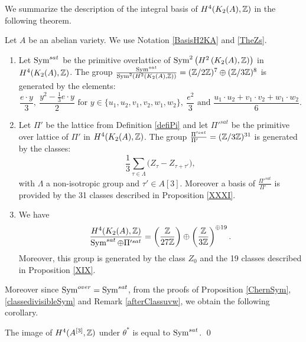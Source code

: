 We summarize the description of the integral basis of $H^{4}(K_2(A),\mathbb{Z})$ in the following theorem.
\begin{thm}\label{integralbasistheorem}
Let $A$ be an abelian variety. We use Notation \ref{BasisH2KA} and \ref{TheZs}. 
\begin{enumerate}
\item 
Let $\operatorname{Sym}^{sat}$ be the primitive overlattice of $\operatorname{Sym}^2\left(H^2\left(K_{ 2 }( A ),\mathbb{Z}\right)\right)$ in $H^4(K_2(A),\mathbb{Z})$.
The group $\frac{\operatorname{Sym}^{sat}}{\operatorname{Sym}^2\left(H^2\left(K_{ 2 }( A ),\mathbb{Z}\right)\right)}=(\mathbb{Z}/2\mathbb{Z})^{7}\oplus(\mathbb{Z}/3\mathbb{Z})^{8}$ is generated by the elements:
$$\frac{e \cdot y}{3},\ \frac{y^2 - \frac{1}{3} e\cdot y}{2} \text{ for } y\in\{u_1,u_2,v_1,v_2,w_1,w_2\},\ 
\frac{e^2}{3} \text{ and } \frac{u_{1}\cdot u_{2}+v_{1}\cdot v_{2}+w_{1}\cdot w_{2}}{6}.$$
\item
Let $\Pi'$ be the lattice from Definition \ref{defiPi} and let $\Pi'^{sat}$ be the primitive over lattice of $\Pi'$ in $H^4(K_2(A),\mathbb{Z})$.
The group $\frac{\Pi'^{sat}}{\Pi'\ \ \ }=(\mathbb{Z}/3\mathbb{Z})^{31}$ is generated by the classes:
$$\frac{1}{3}\sum_{\tau\in\Lambda} \Big(Z_{\tau} - Z_{\tau+\tau'}\Big),
$$
with $\Lambda$ a non-isotropic group and $\tau'\in A[3]$. Moreover a basis of $\frac{\Pi'^{sat}}{\Pi'\ \ \ }$ is provided by the 31 classes described in Proposition \ref{XXXI}. 
\item
We have 
$$\frac{H^4(K_2(A),\mathbb{Z})}{\operatorname{Sym}^{sat}\oplus\Pi'^{sat}}=\left(\frac{\mathbb{Z}}{27\mathbb{Z}}\right)\oplus\left(\frac{\mathbb{Z}}{3\mathbb{Z}}\right)^{\oplus 19}.$$
Moreover, this group is generated by the class $Z_0$ and the 19 classes described in Proposition \ref{XIX}.
\end{enumerate}
\end{thm}
Moreover since $\operatorname{Sym}^{over}=\operatorname{Sym}^{sat}$, from the proofs of Proposition \ref{ChernSym}, \ref{classedivisibleSym} and Remark \ref{afterClassuvw}, we obtain the following corollary.
\begin{corollary}\label{SymSatImage}
The image of $H^4(A^{[3]},\mathbb{Z})$ under $\theta^*$ is equal to $\operatorname{Sym}^{sat}$. \qed
\end{corollary}
